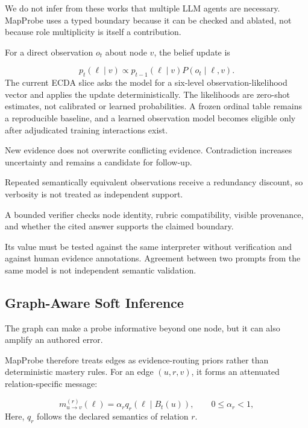 We do not infer from these works that multiple LLM agents are necessary. MapProbe uses a typed boundary
because it can be checked and ablated, not because role multiplicity is itself a contribution.

For a direct observation $o_t$ about node $v$, the belief update is

\begin{equation}
    p_t(\ell\mid v)
    \propto p_{t-1}(\ell\mid v) P(o_t\mid \ell,v).
\end{equation}
The current ECDA slice asks the model for a six-level observation-likelihood vector and applies the
update deterministically. The likelihoods are zero-shot estimates, not calibrated or learned
probabilities. A frozen ordinal table remains a reproducible baseline, and a learned observation model
becomes eligible only after adjudicated training interactions exist.

New evidence does not overwrite conflicting evidence. Contradiction increases uncertainty and remains a
candidate for follow-up.

Repeated semantically equivalent observations receive a redundancy discount, so verbosity is not
treated as independent support.

A bounded verifier checks node identity, rubric compatibility, visible provenance, and whether the cited
answer supports the claimed boundary.

Its value must be tested against the same interpreter without verification and against human evidence
annotations. Agreement between two prompts from the same model is not independent semantic validation.

\subsection{Graph-Aware Soft Inference}

The graph can make a probe informative beyond one node, but it can also amplify an authored error.

MapProbe therefore treats edges as evidence-routing priors rather than deterministic mastery rules. For
an edge $(u,r,v)$, it forms an attenuated relation-specific message:

\begin{equation}
    m_{u\rightarrow v}^{(r)}(\ell)
    = \alpha_r q_r(\ell\mid B_t(u)),
    \qquad 0\leq\alpha_r<1,
\end{equation}
Here, $q_r$ follows the declared semantics of relation $r$.

